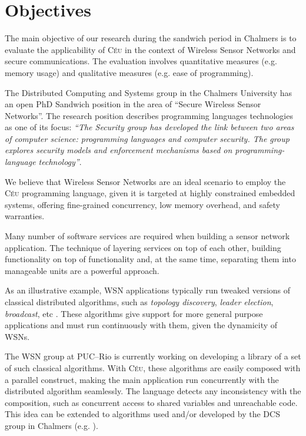 \documentclass[pdftex,12pt,a4paper]{article}
\newcommand{\CEU}{\textsc{C\'{e}u}}
\begin{document}
\section{Objectives}

The main objective of our research during the sandwich period in Chalmers is to 
evaluate the applicability of \CEU{} in the context of Wireless Sensor Networks 
and secure communications.
The evaluation involves quantitative measures (e.g. memory usage) and
qualitative measures (e.g. ease of programming).

The Distributed Computing and Systems group in the Chalmers University has an 
open PhD Sandwich position in the area of ``Secure Wireless Sensor Networks''.
The research position describes programming languages technologies as one of 
its focus:
\emph{``The Security group has developed the link between two areas of computer 
science: programming languages and computer security.
The group explores security models and enforcement mechanisms based on 
programming-language technology''}.

We believe that Wireless Sensor Networks are an ideal scenario to employ the 
\CEU{} programming language, given it is targeted at highly constrained 
embedded systems, offering fine-grained concurrency, low memory overhead, and 
safety warranties.

Many number of software services are required when building a sensor network 
application.
The technique of layering services on top of each other, building functionality 
on top of functionality and, at the same time, separating them into manageable 
units are a powerful approach.

As an illustrative example, WSN applications typically run tweaked versions of 
classical distributed algorithms, such as \emph{topology discovery}, 
\emph{leader election}, \emph{broadcast}, etc \cite{ds.andrews}.
These algorithms give support for more general purpose applications and must 
run continuously with them, given the dynamicity of WSNs.

The WSN group at PUC--Rio is currently working on developing a library of a set 
of such classical algorithms.
With \CEU{}, these algorithms are easily composed with a parallel construct, 
making the main application run concurrently with the distributed algorithm 
seamlessly.
The language detects any inconsistency with the composition, such as concurrent 
access to shared variables and unreachable code.
This idea can be extended to algorithms used and/or developed by the DCS group 
in Chalmers (e.g. \cite{dcs.clusters}).
\end{document}
